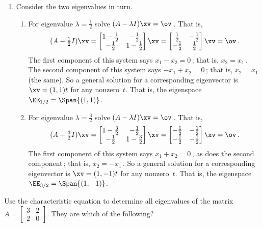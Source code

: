 \begin{example}
\begin{solution}
\begin{enumerate}
\item Consider the two eigenvalues in turn.
\begin{enumerate}
\item For eigenvalue \(\lambda=\frac12\) solve \((A-\lambda I)\xv=\ov\)\,.  That is,
\begin{equation*}
(A-\tfrac12I)\xv
=\begin{bmatrix} 1-\frac12&-\frac12\\
-\frac12&1-\frac12 \end{bmatrix}\xv
=\begin{bmatrix} \frac12&-\frac12\\
-\frac12&\frac12 \end{bmatrix}\xv
=\ov\,.
\end{equation*}
The first component of this system says \(x_1-x_2=0\)\,; that is, \(x_2=x_1\)\,.  
The second component of this system says \(-x_1+x_2=0\)\,; that is, \(x_2=x_1\) (the same).  
So a general solution for a corresponding eigenvector is \(\xv=(1,1)t\) for any nonzero~\(t\).
That is, the eigenspace \(\EE_{1/2}=\Span \{(1,1)\}\).
\item For eigenvalue \(\lambda=\frac32\) solve \((A-\lambda I)\xv=\ov\)\,.  That is,
\begin{equation*}
(A-\tfrac32I)\xv
=\begin{bmatrix} 1-\frac32&-\frac12\\
-\frac12&1-\frac32 \end{bmatrix}\xv
=\begin{bmatrix} -\frac12&-\frac12\\
-\frac12&-\frac12 \end{bmatrix}\xv
=\ov\,.
\end{equation*}
The first component of this system says \(x_1+x_2=0\)\,, as does the second component\,; that is, \(x_2=-x_1\)\,.  
So a general solution for a corresponding eigenvector is \(\xv=(1,-1)t\) for any nonzero~\(t\).
That is, the eigenspace \(\EE_{3/2}=\Span \{(1,-1)\}\).
\end{enumerate}
\end{enumerate}
\end{solution}
\end{example}




\begin{activity}
Use the characteristic equation to determine all eigenvalues of the matrix \(A=\begin{bmatrix} 3&2\\2&0 \end{bmatrix}\).
They are which of the following?
\end{activity}




